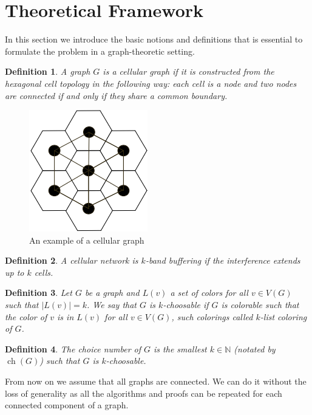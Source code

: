 \documentclass[letterpaper, 10 pt, conference]{ieeeconf}  %
\newtheorem{defi}{Definition}
\DeclareMathOperator*{\ch}{ch}
\begin{document}
\section{Theoretical Framework}
In this section we introduce the basic notions and definitions that is essential to formulate the problem in a graph-theoretic setting.
\begin{defi} A graph $G$ is a  \textit{cellular graph} if it is constructed from the hexagonal cell topology in the following way: each cell is a node and two nodes are connected if and only if they share a common boundary.
\end{defi}
\begin{figure}[!h]
\centering
\includegraphics[scale=0.4]{cellular_graph.png}
\caption{An example of a cellular graph}\label{table:assignment}
\end{figure}
\begin{defi} A cellular network is $k$\textit{-band buffering} if the interference extends up to $k$ cells.
\end{defi}
\begin{defi} Let $G$ be a graph and $L(v)$ a set of colors for all $v \in V(G)$ such that $|L(v)|=k$. We say that $G$ is $k$\textit{-choosable} if $G$ is colorable such that the color of $v$ is in $L(v)$ for all $v \in V(G)$, such colorings called $k$\textit{-list coloring} of $G$.
\end{defi}
\begin{defi} The \textit{choice number} of $G$ is the smallest $k \in \mathbb{N}$ (notated by $\ch(G)$) such that $G$ is $k$-choosable.
\end{defi}

From now on we assume that all graphs are connected. We can do it without the loss of generality as all the algorithms and proofs can be repeated for each connected component of a graph.
\end{document}
